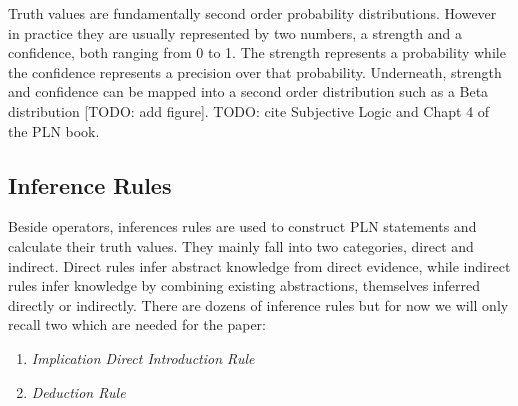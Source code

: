 \documentclass[runningheads]{llncs}
\begin{document}
Truth values are fundamentally second order probability
distributions. However in practice they are usually represented by two
numbers, a strength and a confidence, both ranging from 0 to 1.  The
strength represents a probability while the confidence represents a
precision over that probability.  Underneath, strength and confidence
can be mapped into a second order distribution such as a Beta
distribution [TODO: add figure].  TODO: cite Subjective Logic and
Chapt 4 of the PLN book.

\subsection{Inference Rules}

Beside operators, inferences rules are used to construct PLN
statements and calculate their truth values.  They mainly fall into
two categories, direct and indirect.  Direct rules infer abstract
knowledge from direct evidence, while indirect rules infer knowledge
by combining existing abstractions, themselves inferred directly or
indirectly.  There are dozens of inference rules but for now we will
only recall two which are needed for the paper:
\begin{enumerate}
\item \emph{Implication Direct Introduction Rule}
\item \emph{Deduction Rule}
\end{enumerate}
\end{document}
